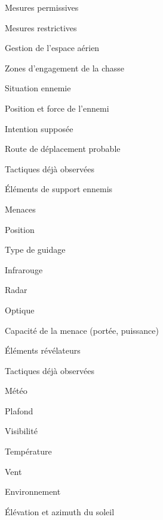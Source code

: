 \begin{e1}
\begin{e2}
\begin{e3}
            \item Mesures permissives
            \item Mesures restrictives
        \end{e3}
        \item Gestion de l’espace aérien
        \item Zones d’engagement de la chasse
    \end{e2}
    \item Situation ennemie
    \begin{e2}
        \item Position et force de l’ennemi
        \begin{e3}
            \item Intention supposée
            \item Route de déplacement probable
            \item Tactiques déjà observées
        \end{e3}
        \item Éléments de support ennemis
        \item Menaces
        \begin{e3}
            \item Position
            \item Type de guidage
            \begin{e4}
                \item Infrarouge
                \item Radar
                \item Optique
            \end{e4}
            \item Capacité de la menace (portée, puissance)
            \item Éléments révélateurs
            \item Tactiques déjà observées
        \end{e3}
    \end{e2}
    \item Météo
    \begin{e2}
        \item Plafond
        \item Visibilité
        \item Température
        \item Vent
    \end{e2}
    \item Environnement
    \begin{e2}
        \item Élévation et azimuth du soleil

\end{e2}
\end{e1}
